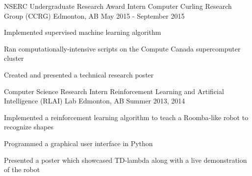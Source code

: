 \begin{cventries}


\cventry
{NSERC Undergraduate Research Award Intern} %
{Computer Curling Research Group (CCRG)} %
{Edmonton, AB} %
{May 2015 - September 2015} %
{ %
\begin{cvitems}
\item {Implemented supervised machine learning algorithm}
\item {Ran computationally-intensive scripts on the Compute Canada supercomputer cluster}
\item {Created and presented a technical research poster}
\end{cvitems}
}


\cventry
{Computer Science Research Intern} %
{Reinforcement Learning and Artificial Intelligence (RLAI) Lab} %
{Edmonton, AB} %
{Summer 2013, 2014} %
{ %
\begin{cvitems}
\item {Implemented a reinforcement learning algorithm to teach a Roomba-like robot to recognize shapes}
\item {Programmed a graphical user interface in Python}
\item {Presented a poster which showcased TD-lambda along with a live demonstration of the robot}
\end{cvitems}
}

\end{cventries}